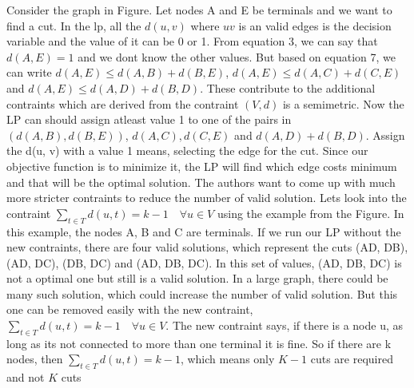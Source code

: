 \documentclass[11pt]{article}
\begin{document}
Consider the graph in Figure. Let nodes A and E be terminals and we want to find a cut. In the lp, all the $d(u,v)$ where $uv$ is an valid edges is the decision variable and the value of it can be 0 or 1. From equation 3, we can say that $d(A, E) = 1$ and we dont know the other values. But based on equation 7, we can write $d(A, E) \le d(A, B) + d(B, E)$, $d(A, E) \le d(A, C) + d(C, E)$ and $d(A, E) \le d(A, D) + d(B, D)$. These contribute to the additional contraints which are derived from the contraint $(V,d)$ is a semimetric. Now the LP can should assign atleast value 1 to one of the pairs in $(d(A, B), d(B, E))$, $d(A, C),  d(C, E)$ and $d(A, D) + d(B, D)$. Assign the d(u, v) with a value 1 means, selecting the edge for the cut. Since our objective function is to minimize it, the LP will find which edge costs minimum and that will be the optimal solution. The authors want to come up with much more stricter contraints to reduce the number of valid solution. Lets look into the contraint $\sum\limits_{t \in T}{d(u, t)} = k - 1 \quad \forall u \in V$ using the example from the Figure. In this example, the nodes A, B and C are terminals. If we run our LP without the new contraints, there are four valid solutions, which represent the cuts {(AD, DB), (AD, DC), (DB, DC) and (AD, DB, DC)}. In this set of values, (AD, DB, DC) is not a optimal one but still is a valid solution. In a large graph, there could be many such solution, which could increase the number of valid solution. But this one can be removed easily with the new contraint, $\sum\limits_{t \in T}{d(u, t)} = k - 1 \quad \forall u \in V$. The new contraint says, if there is a node u, as long as its not connected to more than one terminal it is fine. So if there are k nodes, then $\sum\limits_{t \in T}{d(u, t)} = k - 1$, which means only $K-1$ cuts are required and not $K$ cuts
\end{document}
